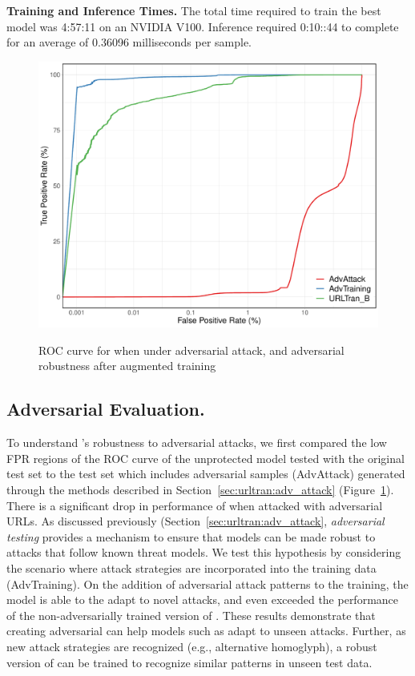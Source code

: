 %

\noindent\textbf{Training and Inference Times.}
The total time required to train the best \URLTranSysb model was 4:57:11 on an NVIDIA V100. Inference
required 0:10::44 to complete for an average of 0.36096 milliseconds per sample.


\begin{figure}
    \centering
	\includegraphics[width=0.7\linewidth,alt={ROC curve under adversarial attack and robustness after training with augmented data.}]{urltran/figures/log_roc_adv_R}
	\caption{ROC curve for \URLTranSysb when under adversarial attack, and adversarial robustness after augmented training}
	\label{fig:urltran:adversarial_roc}
\end{figure} 

\subsection{Adversarial Evaluation.}
To understand \URLTranSys's robustness to adversarial attacks, we first compared the low FPR regions of the ROC curve of the unprotected model tested with the original test set to the
test set which includes adversarial samples (AdvAttack) generated through the methods described in Section~\ref{sec:urltran:adv_attack} (Figure~\ref{fig:urltran:adversarial_roc}).
There is a significant drop in performance of \URLTranSysb when attacked with adversarial URLs.
As discussed previously (Section~\ref{sec:urltran:adv_attack}, \textit{adversarial testing} provides a mechanism to ensure that models can be made robust to attacks that follow known threat models.
We test this hypothesis by considering the scenario where attack strategies are incorporated into the training data (AdvTraining).
On the addition of adversarial attack patterns to the training, the model is able to  the adapt to novel attacks, and even exceeded the performance of the non-adversarially trained version of \URLTranSys.
These results demonstrate that  creating adversarial can help models such as \URLTranSys adapt to unseen attacks.
Further, as new attack strategies are recognized (e.g., alternative homoglyph), a robust version of \URLTranSys can be trained to recognize similar patterns in unseen test data.

